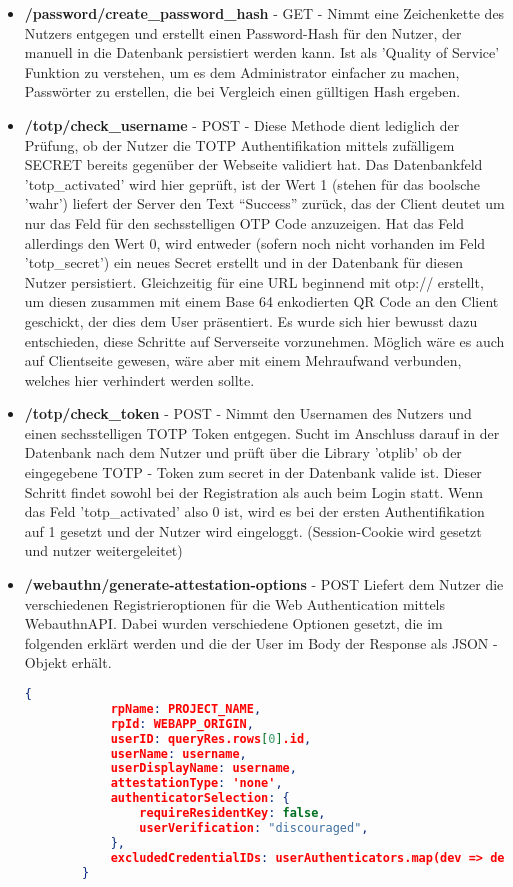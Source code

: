 \begin{enumerate}
\begin{itemize}
 \item \textbf{/password/create\_password\_hash} - GET - Nimmt eine Zeichenkette des Nutzers entgegen und erstellt einen Password-Hash für den Nutzer, der manuell in die Datenbank persistiert werden kann. Ist als 'Quality of Service' Funktion zu verstehen, um es dem Administrator einfacher zu machen, Passwörter zu erstellen, die bei Vergleich einen gülltigen Hash ergeben.
 
 \item \textbf{/totp/check\_username} - POST - Diese Methode dient lediglich der Prüfung, ob der Nutzer die TOTP Authentifikation mittels zufälligem SECRET bereits gegenüber der Webseite validiert hat. Das Datenbankfeld 'totp\_activated' wird hier geprüft, ist der Wert 1 (stehen für das boolsche 'wahr') liefert der Server den Text ``Success'' zurück, das der Client deutet um nur das Feld für den sechsstelligen OTP Code anzuzeigen. Hat das Feld allerdings den Wert 0, wird entweder (sofern noch nicht vorhanden im Feld 'totp\_secret') ein neues Secret erstellt und in der Datenbank für diesen Nutzer persistiert. Gleichzeitig für eine URL beginnend mit otp:// erstellt, um diesen zusammen mit einem Base 64 enkodierten QR Code an den Client geschickt, der dies dem User präsentiert. Es wurde sich hier bewusst dazu entschieden, diese Schritte auf Serverseite vorzunehmen. Möglich wäre es auch auf Clientseite gewesen, wäre aber mit einem Mehraufwand verbunden, welches hier verhindert werden sollte.
 \newpage
 
 \item \textbf{/totp/check\_token} - POST - Nimmt den Usernamen des Nutzers und einen sechsstelligen TOTP Token entgegen. Sucht im Anschluss darauf in der Datenbank nach dem Nutzer und prüft über die Library 'otplib' ob der eingegebene TOTP - Token zum secret in der Datenbank valide ist. Dieser Schritt findet sowohl bei der Registration als auch beim Login statt. Wenn das Feld 'totp\_activated' also 0 ist, wird es bei der ersten Authentifikation auf 1 gesetzt und der Nutzer wird eingeloggt. (Session-Cookie wird gesetzt und nutzer weitergeleitet)

 \item \textbf{/webauthn/generate-attestation-options} - POST
 Liefert dem Nutzer die verschiedenen Registrieroptionen für die Web Authentication mittels WebauthnAPI. Dabei wurden verschiedene Optionen gesetzt, die im folgenden erklärt werden und die der User im Body der Response als JSON - Objekt erhält.
 
 \begin{lstlisting}[language=json,firstnumber=1]
        {
            rpName: PROJECT_NAME,
            rpId: WEBAPP_ORIGIN,
            userID: queryRes.rows[0].id,
            userName: username,
            userDisplayName: username,
            attestationType: 'none',
            authenticatorSelection: {
                requireResidentKey: false,
                userVerification: "discouraged",
            },
            excludedCredentialIDs: userAuthenticators.map(dev => dev.credentialID),
        }
\end{lstlisting}


\end{itemize}
\end{enumerate}
